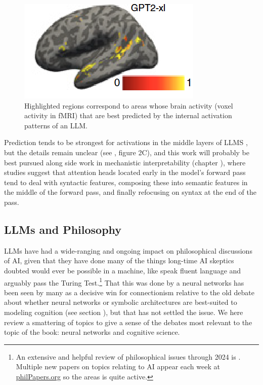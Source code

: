 \begin{figure}[ht]
\centering
\includegraphics[scale=.9]{./images/brainPredictionsLLM.png}
\caption[From \cite{schrimpf2021neural}.]{Highlighted regions correspond to
areas whose brain activity (voxel activity in fMRI) that are best predicted by
the internal activation patterns of an LLM.
}
\label{brainPredictionLLM}
\end{figure}

Prediction tends to be strongest for activations in the middle layers of LLMS
\cite{caucheteux2022brains}, but the details remain unclear (see
\cite{schrimpf2021neural}, figure 2C), and this work will probably be best
pursued along side work in mechanistic interpretability  (chapter
), where studies suggest that attention heads located
early in the model's forward pass tend to deal with syntactic features,
composing these into semantic features in the middle of the forward pass, and
finally refocusing on syntax at the end of the pass.


\subsection{LLMs and Philosophy}\label{llmPhilosophy}

LLMs have had a wide-ranging and ongoing impact on philosophical discussions of
AI, given that they have done many of the things long-time AI skeptics doubted
would ever be possible in a machine, like speak fluent language and arguably
pass the Turing Test.\footnote{An extensive and helpful review of philosophical
issues through 2024 is \cite{milliere2024philosophical1,
milliere2024philosophical2}. Multiple new papers on topics relating to AI
appear each week at \url{philPapers.org} so the areas is quite active.} That
this was done by a neural networks has been seen by many as a decisive win for
connectionism relative to the old debate about whether neural networks or
symbolic architectures are best-suited to modeling cognition (see section
), but that has not settled the issue. We here review  a
smattering of topics to give a sense of the debates most relevant to the topic
of the book: neural networks and cognitive science.  

